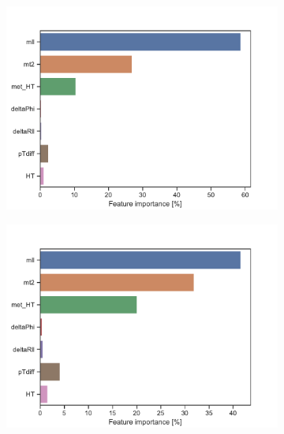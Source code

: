 \begin{figure}[H]
    \centering
    \begin{subfigure}[t!]{0.49\textwidth}
        \includegraphics[width = \textwidth]{Figures/SlepSlep/ML/BDT/High_level/Inter/featureImportance.pdf}
        \caption{}
        \label{fig:featSlepslepLow}
    \end{subfigure}
    \begin{subfigure}[t!]{0.49\textwidth}
        \includegraphics[width = \textwidth]{Figures/SlepSnu/BDT/High_level/Inter/featureImportance.pdf}
        \caption{}
        \label{fig:featSlepsnuLow}
    \end{subfigure}
    \begin{subfigure}[t!]{0.49\textwidth}

\end{subfigure}
\end{figure}
